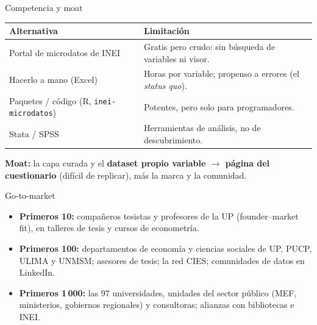 \documentclass[aspectratio=169,11pt]{beamer}
\begin{document}
\begin{frame}{Competencia y moat}
  \begin{center}\small
  \renewcommand{\arraystretch}{1.15}
  \begin{tabular}{>{\raggedright}p{5.0cm} >{\raggedright\arraybackslash}p{7.3cm}}
    \toprule
    \textbf{\color{AzulStats}Alternativa} & \textbf{\color{AzulStats}Limitación} \\
    \midrule
    Portal de microdatos de INEI & Gratis pero crudo: sin búsqueda de variables ni visor. \\
    Hacerlo a mano (Excel) & Horas por variable; propenso a errores (el \textit{status quo}). \\
    Paquetes / código (R, \texttt{inei-microdatos}) & Potentes, pero solo para programadores. \\
    Stata / SPSS & Herramientas de análisis, no de descubrimiento. \\
    \bottomrule
  \end{tabular}
  \end{center}
  \vspace{0.15cm}
  {\small\color{AzulStats}\textbf{Moat:} la capa curada y el \textbf{dataset propio variable $\to$ página
  del cuestionario} (difícil de replicar), más la marca y la comunidad.}
\end{frame}

\begin{frame}{Go-to-market}
  \begin{itemize}
    \item \textbf{Primeros 10:} compañeros tesistas y profesores de la UP (founder--market fit), en
      talleres de tesis y cursos de econometría.
    \item \textbf{Primeros 100:} departamentos de economía y ciencias sociales de UP, PUCP, ULIMA y
      UNMSM; asesores de tesis; la red CIES; comunidades de datos en LinkedIn.
    \item \textbf{Primeros 1\,000:} las 97 universidades, unidades del sector público (MEF,
      ministerios, gobiernos regionales) y consultoras; alianzas con bibliotecas e INEI.
  \end{itemize}
\end{frame}
\end{document}
